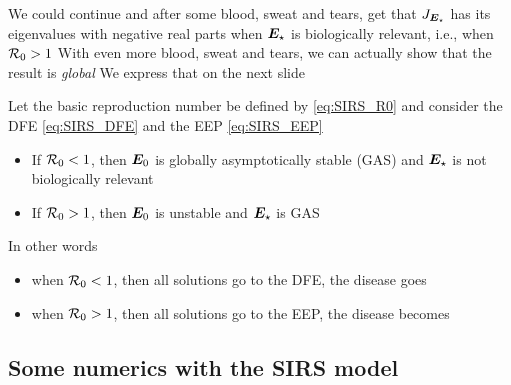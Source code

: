 \documentclass[aspectratio=169]{beamer}\usepackage[]{graphicx}\usepackage[]{xcolor}
\begin{document}
\begin{frame}
We could continue and after some blood, sweat and tears, get that $J_{\bm{E}_\star}$ has its eigenvalues with negative real parts when $\bm{E}_\star$ is biologically relevant, i.e., when $\mathcal{R}_0>1$
\vfill
With even more blood, sweat and tears, we can actually show that the result is \emph{global}
\vfill We express that on the next slide
\end{frame}

\begin{frame}
\begin{theorem}\label{th:SIRS_GAS_behaviour}
Let the basic reproduction number be defined by \eqref{eq:SIRS_R0} and consider the DFE \eqref{eq:SIRS_DFE} and the EEP \eqref{eq:SIRS_EEP}
\vskip1cm
\begin{itemize}
\item If $\mathcal{R}_0<1$, then $\bm{E}_0$ is globally asymptotically stable (GAS) and $\bm{E}_\star$ is not biologically relevant
\item If $\mathcal{R}_0>1$, then $\bm{E}_0$ is unstable and $\bm{E}_\star$ is GAS
\end{itemize}
\end{theorem}
\vfill
In other words
\begin{itemize}
\item when $\mathcal{R}_0<1$, then all solutions go to the DFE, the disease goes 
\item when $\mathcal{R}_0>1$, then all solutions go to the EEP, the disease becomes 
\end{itemize}
\end{frame}

\subsection{Some numerics with the SIRS model}
\end{document}

